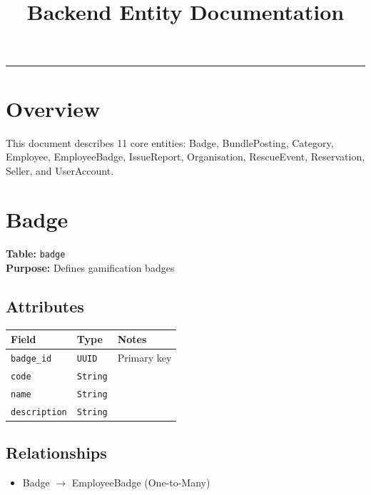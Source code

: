 \documentclass[a4paper,11pt]{article}
\title{Backend Entity Documentation}
\date{}
\begin{document}
\maketitle
\hrule
\vspace{1em}


\section*{Overview}



This document describes 11 core entities: Badge, BundlePosting, Category, Employee, EmployeeBadge, IssueReport, Organisation, RescueEvent, Reservation, Seller, and UserAccount.



\section{Badge}

\textbf{Table:} \texttt{badge} \\
\textbf{Purpose:} Defines gamification badges

\subsection*{Attributes}
\begin{longtable}{|p{4cm}|p{3cm}|p{6cm}|}
\hline
\textbf{Field} & \textbf{Type} & \textbf{Notes} \\
\hline
\texttt{badge\_id} & \texttt{UUID} & Primary key \\
\texttt{code} & \texttt{String} &  \\
\texttt{name} & \texttt{String} &  \\
\texttt{description} & \texttt{String} &  \\
\hline
\end{longtable}

\subsection*{Relationships}
\begin{itemize}
  \item Badge $\rightarrow$ EmployeeBadge (One-to-Many)
\end{itemize}

\end{document}
